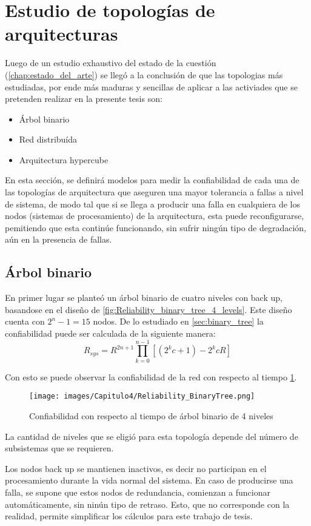 \section{Estudio de topologías de arquitecturas}
Luego de un estudio exhaustivo del estado de la cuestión (\autoref{chap:estado_del_arte}) se llegó a la conclusión de que las topologias más estudiadas, por ende más maduras y sencillas de aplicar a las activiades que se pretenden realizar en la presente tesis son:
\begin{itemize}
  \item Árbol binario
  \item Red distribuída
  \item Arquitectura hypercube
\end{itemize}

En esta sección, se definirá modelos para medir la confiabilidad de cada una de las topologías de arquitectura que aseguren una mayor tolerancia a fallas a nivel de sistema, de modo tal que si se llega a producir una falla en cualquiera de los nodos (sistemas de procesamiento) de la arquitectura, esta puede reconfigurarse, pemitiendo que esta continúe funcionando, sin sufrir ningún tipo de degradación, aún en la presencia de fallas.

\subsection{Árbol binario}
En primer lugar se planteó un árbol binario de cuatro niveles con back up, basandose en el diseño de \cite{Raghavendra84} \ref{fig:Reliability_binary_tree_4_levels}. Este diseño cuenta con $2^n - 1 =  15$ nodos. De lo estudiado en \autoref{sec:binary_tree} la confiabilidad puede ser calculada de la siguiente manera: $$R_{sys} = R^{2n +1} \prod_{k=0}^{n-1}{[(2^kc+1) - 2^kcR]}$$

Con esto se puede observar la confiabilidad de la red con respecto al tiempo \ref{fig:Reliability_binary_tree_4_levels_2}.

\begin{figure}[H]
 \centering
 \texttt{[image: images/Capitulo4/Reliability\_BinaryTree.png]}
  \caption{Confiabilidad con respecto al tiempo de árbol binario de 4 niveles}
\label{fig:Reliability_binary_tree_4_levels_2}
\end{figure}

La cantidad de niveles que se eligió para esta topología depende del número de subsistemas que se requieren.

Los nodos back up se mantienen inactivos, es decir no participan en el procesamiento durante la vida normal del sistema. En caso de producirse una falla, se supone que estos nodos de redundancia, comienzan a funcionar automáticamente, sin ninún tipo de retraso. Esto, que no corresponde con la realidad, permite simplificar los cálculos para este trabajo de tesis.


